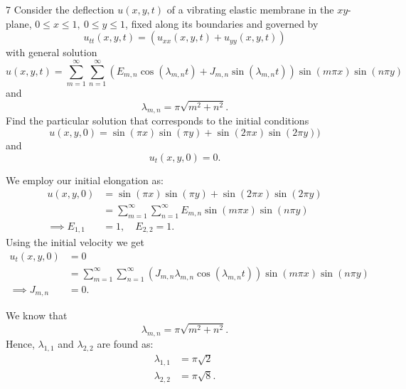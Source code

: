 \begin{problem}{7}
  Consider the deflection $u(x,y,t)$ of a vibrating elastic membrane in the $xy$-plane, $0 \leq x \leq 1, \: 0 \leq y \leq 1$, fixed along its boundaries and governed by
  \begin{equation*}
    u_{t t}(x,y,t) = \left( u_{x x}(x,y,t) + u_{yy}(x,y,t) \right)
  \end{equation*}
  with general solution
  \begin{equation*}
    u(x,y,t) = \sum_{m = 1}^{\infty} \sum_{n = 1}^{\infty} \left( E_{m,n} \cos \left( \lambda_{m,n} t \right) + J_{m,n} \sin \left( \lambda_{m,n} t \right) \right) \sin (m \pi x) \sin (n \pi y)
  \end{equation*}
  and
  \begin{equation*}
    \lambda_{m,n} = \pi \sqrt{m^2 + n^2}
  .\end{equation*}
  Find the particular solution that corresponds to the initial conditions
  \begin{equation*}
    u(x,y,0) = \sin (\pi x) \sin (\pi y) + \sin (2\pi x) \sin (2\pi y))
  \end{equation*}
  and
  \begin{equation*}
    u_t(x,y,0) = 0
  .\end{equation*}
\end{problem}

\begin{derivation}
  We employ our initial elongation as:
  \begin{align*}
    u(x,y,0) &= \sin (\pi x) \sin (\pi y) + \sin (2\pi x) \sin (2\pi y) \\
             &= \sum_{m = 1}^{\infty} \sum_{n = 1}^{\infty} E_{m,n} \sin(m \pi x) \sin (n \pi y) \\
    \implies E_{1,1} &= 1, \quad E_{2,2} = 1
  .\end{align*}
  Using the initial velocity we get
  \begin{align*}
    u_t(x,y,0) &= 0 \\
    &= \sum_{m = 1}^{\infty} \sum_{n  =1}^{\infty} \left( J_{m,n} \lambda_{m,n} \cos (\lambda_{m,n}t) \right) \sin (m \pi x) \sin (n \pi y) \\
    \implies J_{m,n} &= 0
  .\end{align*}
  
  We know that
  \begin{equation*}
    \lambda_{m,n} = \pi \sqrt{m^2 + n^2}
  .\end{equation*}
  Hence, $\lambda_{1,1}$ and $\lambda_{2,2}$ are found as:
  \begin{align*}
    \lambda_{1,1} &= \pi \sqrt{2} \\
    \lambda_{2,2} &= \pi \sqrt{8}
  .\end{align*}
\end{derivation}

